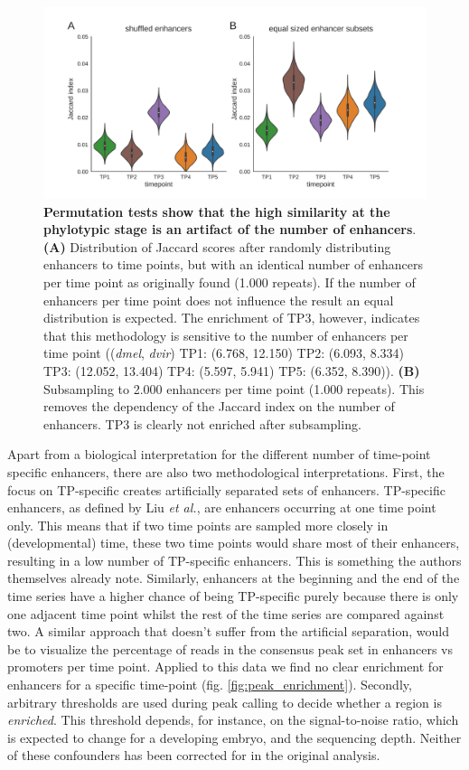 \begin{figure}[H]
    \includegraphics[width=\linewidth]{ch.hourglass/images/fly_shuffle.png}
    \caption{\textbf{Permutation tests show that the high similarity at the phylotypic stage is an artifact of the number of enhancers}. \textbf{(A)} Distribution of Jaccard scores after randomly distributing enhancers to time points, but with an identical number of enhancers per time point as originally found (1.000 repeats). If the number of enhancers per time point does not influence the result an equal distribution is expected. The enrichment of TP3, however, indicates that this methodology is sensitive to the number of enhancers per time point ((\textit{dmel}, \textit{dvir}) TP1: (6.768, 12.150) TP2: (6.093, 8.334) TP3: (12.052, 13.404) TP4: (5.597, 5.941) TP5: (6.352, 8.390)). \textbf{(B)} Subsampling to 2.000 enhancers per time point (1.000 repeats). This removes the dependency of the Jaccard index on the number of enhancers. TP3 is clearly not enriched after subsampling.}
    \label{fig:shuffle}
\end{figure}

Apart from a biological interpretation for the different number of time-point specific enhancers, there are also two methodological interpretations. First, the focus on TP-specific creates artificially separated sets of enhancers. TP-specific enhancers, as defined by Liu \textit{et al.}, are enhancers occurring at one time point only. This means that if two time points are sampled more closely in (developmental) time, these two time points would share most of their enhancers, resulting in a low number of TP-specific enhancers. This is something the authors themselves already note. Similarly, enhancers at the beginning and the end of the time series have a higher chance of being TP-specific purely because there is only one adjacent time point whilst the rest of the time series are compared against two. A similar approach that doesn't suffer from the artificial separation, would be to visualize the percentage of reads in the consensus peak set in enhancers vs promoters per time point. Applied to this data we find no clear enrichment for enhancers for a specific time-point (fig. \ref{fig:peak_enrichment}). Secondly, arbitrary thresholds are used during peak calling to decide whether a region is \textit{enriched}. This threshold depends, for instance, on the signal-to-noise ratio, which is expected to change for a developing embryo, and the sequencing depth\cite{encode_guidelines2012}. Neither of these confounders has been corrected for in the original analysis.

